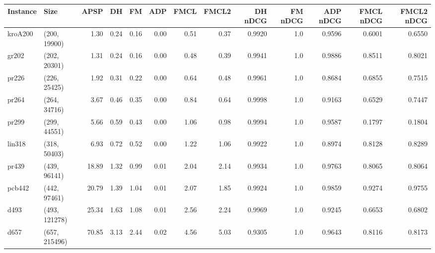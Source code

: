 \begin{tabular}{llrrrrrrrrrrr}
\toprule
Instance &          Size &  APSP &   DH &   FM &  ADP &  FMCL &  FMCL2 &  DH nDCG &  FM nDCG &  ADP nDCG &  FMCL nDCG &  FMCL2 nDCG \\
\midrule
 kroA200 &  (200, 19900) &  1.30 & 0.24 & 0.16 & 0.00 &  0.51 &   0.37 &   0.9920 &      1.0 &    0.9596 &     0.6001 &      0.6550 \\
   gr202 &  (202, 20301) &  1.31 & 0.24 & 0.16 & 0.00 &  0.48 &   0.39 &   0.9941 &      1.0 &    0.9886 &     0.8511 &      0.8021 \\
   pr226 &  (226, 25425) &  1.92 & 0.31 & 0.22 & 0.00 &  0.64 &   0.48 &   0.9961 &      1.0 &    0.8684 &     0.6855 &      0.7515 \\
   pr264 &  (264, 34716) &  3.67 & 0.46 & 0.35 & 0.00 &  0.84 &   0.64 &   0.9998 &      1.0 &    0.9163 &     0.6529 &      0.7447 \\
   pr299 &  (299, 44551) &  5.66 & 0.59 & 0.43 & 0.00 &  1.06 &   0.98 &   0.9994 &      1.0 &    0.9587 &     0.1797 &      0.1804 \\
  lin318 &  (318, 50403) &  6.93 & 0.72 & 0.52 & 0.00 &  1.22 &   1.06 &   0.9922 &      1.0 &    0.8974 &     0.8128 &      0.8289 \\
   pr439 &  (439, 96141) & 18.89 & 1.32 & 0.99 & 0.01 &  2.04 &   2.14 &   0.9934 &      1.0 &    0.9763 &     0.8065 &      0.8064 \\
  pcb442 &  (442, 97461) & 20.79 & 1.39 & 1.04 & 0.01 &  2.07 &   1.85 &   0.9924 &      1.0 &    0.9859 &     0.9274 &      0.9755 \\
    d493 & (493, 121278) & 25.34 & 1.63 & 1.08 & 0.01 &  2.56 &   2.24 &   0.9969 &      1.0 &    0.9245 &     0.6653 &      0.6802 \\
    d657 & (657, 215496) & 70.85 & 3.13 & 2.44 & 0.02 &  4.56 &   5.03 &   0.9305 &      1.0 &    0.9643 &     0.8116 &      0.8173 \\
\bottomrule
\end{tabular}
